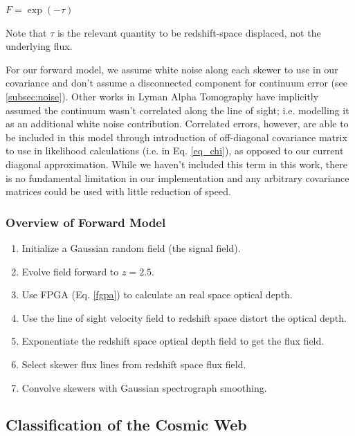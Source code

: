 \documentclass[times]{aastex62}
\begin{document}
$F = \exp\left(-\tau\right)$

Note that $\tau$ is the relevant quantity to be redshift-space displaced, not the underlying flux. 


For our forward model, we assume white noise along each skewer to use in our covariance and don't assume a disconnected component for continuum error (see \ref{subsec:noise}). Other works in Lyman Alpha Tomography have implicitly assumed the continuum wasn't correlated along the line of sight; i.e. modelling it as an additional white noise contribution. Correlated errors, however, are able to be included in this model through introduction of off-diagonal covariance matrix to use in likelihood calculations (i.e. in Eq. \ref{eq_chi}), as opposed to our current diagonal approximation. While we haven't included this term in this work, there is no fundamental limitation in our implementation and any arbitrary covariance matrices could be used with little reduction of speed. 

\subsubsection{Overview of Forward Model}

\begin{enumerate}
\item Initialize a Gaussian random field (the signal field).
\item Evolve field forward to $z = 2.5$.
\item Use FPGA (Eq. \ref{fgpa}) to calculate an real space optical depth.
\item Use the line of sight velocity field to redshift space distort the optical depth.
\item Exponentiate the redshift space optical depth field to get the flux field.
\item Select skewer flux lines from redshift space flux field.
\item Convolve skewers with Gaussian spectrograph smoothing.
\end{enumerate}

\subsection{Classification of the Cosmic Web}
\end{document}
